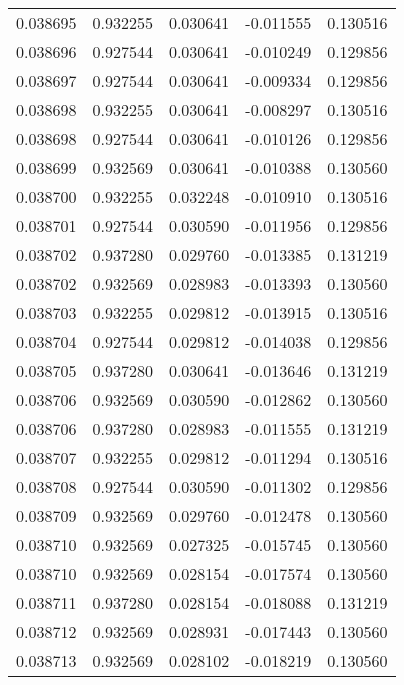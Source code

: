 \begin{tabular}{lrrrr}
0.038695    &  0.932255 &  0.030641 & -0.011555 &             0.130516 \\
0.038696    &  0.927544 &  0.030641 & -0.010249 &             0.129856 \\
0.038697    &  0.927544 &  0.030641 & -0.009334 &             0.129856 \\
0.038698    &  0.932255 &  0.030641 & -0.008297 &             0.130516 \\
0.038698    &  0.927544 &  0.030641 & -0.010126 &             0.129856 \\
0.038699    &  0.932569 &  0.030641 & -0.010388 &             0.130560 \\
0.038700    &  0.932255 &  0.032248 & -0.010910 &             0.130516 \\
0.038701    &  0.927544 &  0.030590 & -0.011956 &             0.129856 \\
0.038702    &  0.937280 &  0.029760 & -0.013385 &             0.131219 \\
0.038702    &  0.932569 &  0.028983 & -0.013393 &             0.130560 \\
0.038703    &  0.932255 &  0.029812 & -0.013915 &             0.130516 \\
0.038704    &  0.927544 &  0.029812 & -0.014038 &             0.129856 \\
0.038705    &  0.937280 &  0.030641 & -0.013646 &             0.131219 \\
0.038706    &  0.932569 &  0.030590 & -0.012862 &             0.130560 \\
0.038706    &  0.937280 &  0.028983 & -0.011555 &             0.131219 \\
0.038707    &  0.932255 &  0.029812 & -0.011294 &             0.130516 \\
0.038708    &  0.927544 &  0.030590 & -0.011302 &             0.129856 \\
0.038709    &  0.932569 &  0.029760 & -0.012478 &             0.130560 \\
0.038710    &  0.932569 &  0.027325 & -0.015745 &             0.130560 \\
0.038710    &  0.932569 &  0.028154 & -0.017574 &             0.130560 \\
0.038711    &  0.937280 &  0.028154 & -0.018088 &             0.131219 \\
0.038712    &  0.932569 &  0.028931 & -0.017443 &             0.130560 \\
0.038713    &  0.932569 &  0.028102 & -0.018219 &             0.130560 \\

\end{tabular}

